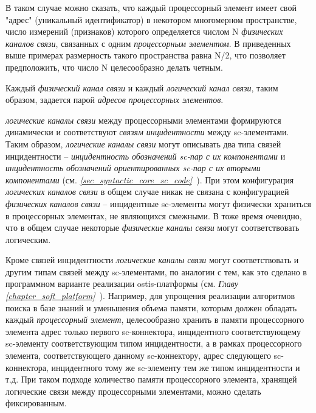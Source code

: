 \begin{textitemize}
\begin{textitemize}
		\item В таком случае можно сказать, что каждый процессорный элемент имеет свой "адрес"{} (уникальный идентификатор) в некотором многомерном пространстве, число измерений (признаков) которого определяется числом N \textit{физических каналов связи}, связанных с одним \textit{процессорным элементом}. В приведенных выше примерах размерность такого пространства равна N/2, что позволяет предположить, что число N целесообразно делать четным.
		\item Каждый \textit{физический канал связи} и каждый \textit{логический канал связи}, таким образом, задается парой \textit{адресов процессорных элементов}.
		\item \textit{логические каналы связи} между процессорными элементами формируются динамически и соответствуют \textit{связям инцидентности} между sc-элементами. Таким образом, \textit{логические каналы связи} могут описывать два типа связей инцидентности -- \textit{инцидентность обозначений sc-пар с их компонентами} и \textit{инцидентность обозначений ориентированных sc-пар с их вторыми компонентами} (см. \textit{\ref{sec_syntactic_core_sc_code}~}). При этом конфигурация \textit{логических каналов связи} в общем случае никак не связана с конфигурацией \textit{физических каналов связи} -- инцидентные sc-элементы могут физически храниться в процессорных элементах, не являющихся смежными. В тоже время очевидно, что в общем случае некоторые \textit{физические каналы связи} могут соответствовать логическим.
		\item Кроме связей инцидентности \textit{логические каналы связи} могут соответствовать и другим типам связей между sc-элементами, по аналогии с тем, как это сделано в программном варианте реализации ostis-платформы (см. \textit{Главу \ref{chapter_soft_platform}~}). Например, для упрощения реализации алгоритмов поиска в базе знаний и уменьшения объема памяти, которым должен обладать каждый \textit{процессорный элемент}, целесообразно хранить в памяти процессорного элемента адрес только первого sc-коннектора, инцидентного соответствующему sc-элементу соответствующим типом инцидентности, а в рамках процессорного элемента, соответствующего данному sc-коннектору, адрес следующего sc-коннектора, инцидентного тому же sc-элементу тем же типом инцидентности и т.д. При таком подходе количество памяти процессорного элемента, хранящей логические связи между процессорными элементами, можно сделать фиксированным.
	\end{textitemize}

\end{textitemize}
